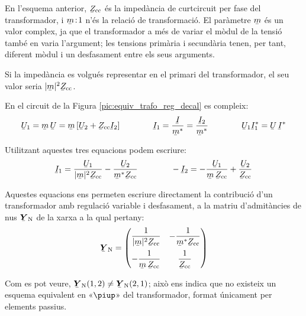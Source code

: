 En l'esquema anterior, $\cmplx{Z}\ped{cc}$ és la impedància de curtcircuit per fase del transformador, i $\cmplx{m}\!:\!1$ n'és la
relació de transformació. El paràmetre $\cmplx{m}$ és un valor
complex, ja que el transformador a més de variar el mòdul de la
tensió també en varia  l'argument; les tensions primària i
secundària tenen, per tant,  diferent mòdul i un desfasament entre els
seus arguments.

Si la impedància es volgués representar en el primari del
transformador, el seu valor seria $|\cmplx{m}|^2 \cmplx{Z}\ped{cc}$.

En el circuit de la Figura \vref{pic:equiv_trafo_reg_decal} es
compleix: 
\begin{equation}
   \cmplx{U}_1 = \cmplx{m} \,\cmplx{U} = \cmplx{m}\,
   [\cmplx{U}_2+\cmplx{Z}\ped{cc}\cmplx{I}_2]
   \qquad\qquad
   \cmplx{I}_1 = \frac{\cmplx{I}}{\cmplx{m}^*} = \frac{\cmplx{I}_2}{\cmplx{m}^*}
   \qquad\qquad
   \cmplx{U}_1 \cmplx{I}_1^* = \cmplx{U} \,\cmplx{I}^*
\end{equation}

Utilitzant aquestes tres equacions podem escriure:
\begin{equation}
   \cmplx{I}_1 = \frac{\cmplx{U}_1}{|\cmplx{m}|^2 \cmplx{Z}\ped{cc}} - \frac{\cmplx{U}_2}
   {\cmplx{m}^* \cmplx{Z}\ped{cc}} \qquad\qquad
   - \cmplx{I}_2 = - \frac{\cmplx{U}_1}{\cmplx{m} \,\cmplx{Z}\ped{cc}} + \frac{\cmplx{U}_2}
   {\cmplx{Z}\ped{cc}}
\end{equation}

Aquestes equacions ens permeten escriure directament la
contribució d'un transformador amb regulació variable i desfasament, a
la matriu d'admitàncies de nus $\mcmplx{Y}\ped{N}$ de la xarxa a la
qual pertany: 
\begin{equation} \label{eq:yn_trafo_reg_decal}
   \mcmplx{Y}\ped{N} = \begin{pmatrix}
     \dfrac{1}{|\cmplx{m}|^2 \cmplx{Z}\ped{cc}} & - \dfrac{1}
   {\cmplx{m}^* \cmplx{Z}\ped{cc}} \\[2.5ex]
     - \dfrac{1}{\cmplx{m} \,\cmplx{Z}\ped{cc}} & \dfrac{1}
   {\cmplx{Z}\ped{cc}}
   \end{pmatrix}
\end{equation}

Com es pot veure, $\mcmplx{Y}\ped{N}(1,2) \neq
\mcmplx{Y}\ped{N}(2,1)$; això ens indica que no existeix un esquema
equivalent en «$\piup$» del transformador, format únicament per
elements passius.

